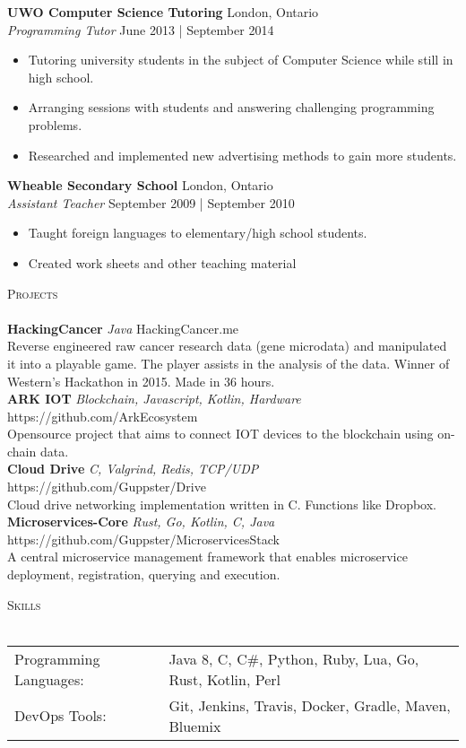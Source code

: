 \documentclass[a4paper]{article}
\newcommand{\lineunder} {
    \vspace*{-8pt} \\
    \hspace*{-18pt} \hrulefill \\
}
\newcommand{\header} [1] {
    {\hspace*{-18pt}\vspace*{6pt} \textsc{#1}}
    \vspace*{-6pt} \lineunder
}
\begin{document}
\textbf{UWO Computer Science Tutoring} \hfill London, Ontario\\
\textit{Programming Tutor} \hfill June 2013 | September 2014\\
\vspace{-1mm}
\begin{itemize} \itemsep 1pt
	\item Tutoring university students in the subject of Computer Science while still in high school.
	\item Arranging sessions with students and answering challenging programming problems.
	\item Researched and implemented new advertising methods to gain more students.
\end{itemize}

\textbf{Wheable Secondary School} \hfill London, Ontario\\
\textit{Assistant Teacher} \hfill September 2009 | September 2010\\
\vspace{-1mm}
\begin{itemize} \itemsep 1pt
	\item Taught foreign languages to elementary/high school students.
	\item Created work sheets and other teaching material
\end{itemize}

\header{Projects}
{\textbf{HackingCancer} \sl Java} \hfill HackingCancer.me\\
Reverse engineered raw cancer research data (gene microdata) and manipulated it into a playable game. The player assists in the analysis of the data. Winner of Western’s Hackathon in 2015. Made in 36 hours.\\
\vspace*{2mm}
{\textbf{ARK IOT} \sl Blockchain, Javascript, Kotlin, Hardware} \hfill https://github.com/ArkEcosystem\\
Opensource project that aims to connect IOT devices to the blockchain using on-chain data.\\
\vspace*{2mm}
{\textbf{Cloud Drive} \sl C, Valgrind, Redis, TCP/UDP} \hfill https://github.com/Guppster/Drive\\
Cloud drive networking implementation written in C. Functions like Dropbox.\\
\vspace*{2mm}
{\textbf{Microservices-Core} \sl Rust, Go, Kotlin, C, Java} \hfill https://github.com/Guppster/MicroservicesStack\\
A central microservice management framework that enables microservice deployment, registration, querying and execution.\\

\vspace*{2mm}

\header{Skills}
\begin{tabular}{ l l }
	Programming Languages: & Java 8, C, C\#, Python, Ruby, Lua, Go, Rust, Kotlin, Perl \\
	DevOps Tools:          & Git, Jenkins, Travis, Docker, Gradle, Maven, Bluemix \\
\end{tabular}

\vspace*{2mm}

\vspace*{2mm}
        

\ 
\end{document}
